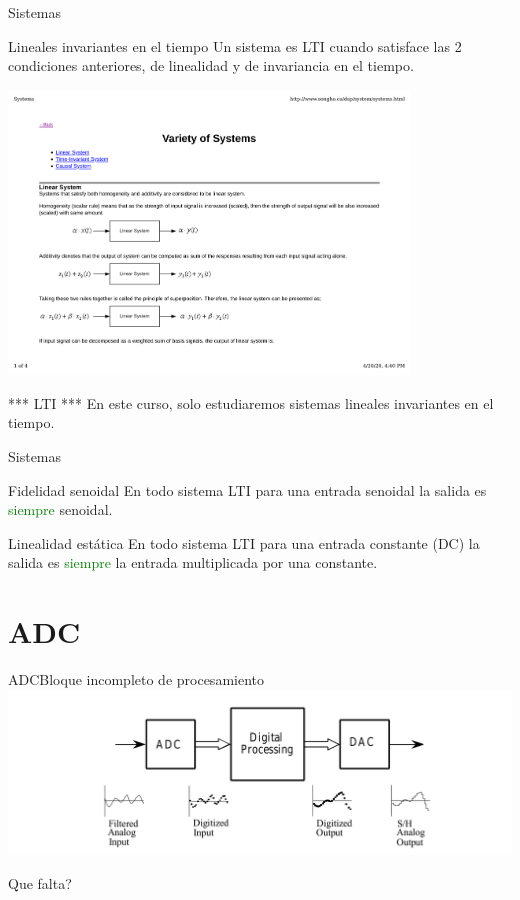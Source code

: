  \begin{frame}{Sistemas}{}
    \begin{block}{Lineales invariantes en el tiempo}
       Un sistema es LTI cuando satisface las 2 condiciones anteriores, de linealidad y de invariancia en el tiempo.
    \end{block}
    \center\includegraphics[width=0.8\textwidth]{1_clase/lti}
    \vfill
    \begin{alertblock}{*** LTI ***}
       En este curso, \alert{solo} estudiaremos sistemas lineales invariantes en el tiempo.
    \end{alertblock}
 \end{frame}
 \begin{frame}{Sistemas}{}
    \begin{block}{Fidelidad senoidal}
       En todo sistema LTI para una entrada senoidal la salida es \textcolor{green}{siempre} senoidal.
    \end{block}
    \begin{block}{Linealidad estática}
       En todo sistema LTI para una entrada constante (DC) la salida es \textcolor{green}{siempre} la entrada multiplicada por una constante.
    \end{block}
    \vfill
 \end{frame}
 \section{ADC}
 \begin{frame}{ADC}{Bloque incompleto de procesamiento}
    \center\includegraphics[width=1\textwidth]{1_clase/adc_dac1}
    \begin{alertblock} {Que falta?}
    \end{alertblock}
    \vfill
 \end{frame}
